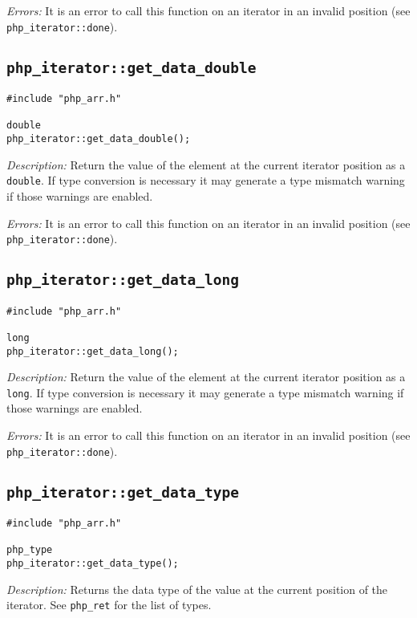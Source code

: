 \documentclass[11pt,titlepage]{article}
\begin{document}
\emph{Errors:} It is an error to call this function on an iterator in an invalid position (see \verb|php_iterator::done|).


\subsection{\texttt{php\_iterator::get\_data\_double}}

\begin{verbatim}
#include "php_arr.h"

double 
php_iterator::get_data_double();
\end{verbatim}

\emph{Description:} Return the value of the element at the current iterator position as a \verb|double|. If type conversion is necessary it may generate a type mismatch warning if those warnings are enabled.

\emph{Errors:} It is an error to call this function on an iterator in an invalid position (see \verb|php_iterator::done|).


\subsection{\texttt{php\_iterator::get\_data\_long}}

\begin{verbatim}
#include "php_arr.h"

long 
php_iterator::get_data_long();
\end{verbatim}

\emph{Description:} Return the value of the element at the current iterator position as a \verb|long|. If type conversion is necessary it may generate a type mismatch warning if those warnings are enabled.

\emph{Errors:} It is an error to call this function on an iterator in an invalid position (see \verb|php_iterator::done|).


\subsection{\texttt{php\_iterator::get\_data\_type}}

\begin{verbatim}
#include "php_arr.h"

php_type 
php_iterator::get_data_type();
\end{verbatim}

\emph{Description:} Returns the data type of the value at the current position of the iterator. See \verb|php_ret| for the list of types.
\end{document}
